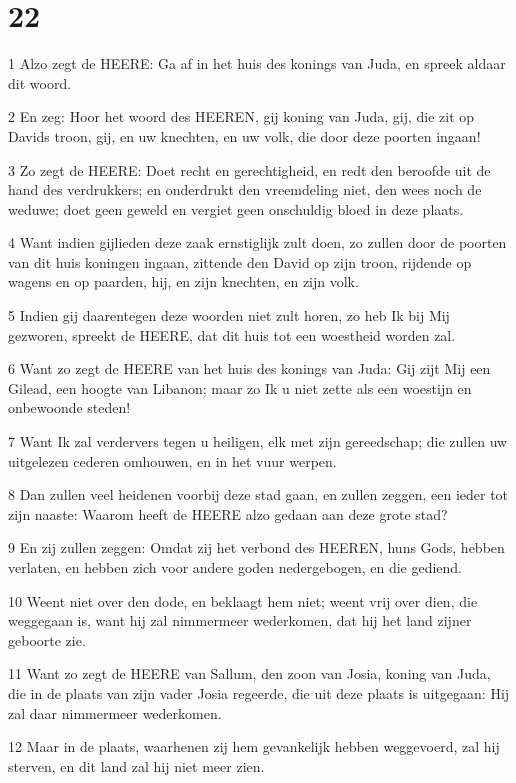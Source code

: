 \chapter{22}

\par 1 Alzo zegt de HEERE: Ga af in het huis des konings van Juda, en spreek aldaar dit woord.
\par 2 En zeg: Hoor het woord des HEEREN, gij koning van Juda, gij, die zit op Davids troon, gij, en uw knechten, en uw volk, die door deze poorten ingaan!
\par 3 Zo zegt de HEERE: Doet recht en gerechtigheid, en redt den beroofde uit de hand des verdrukkers; en onderdrukt den vreemdeling niet, den wees noch de weduwe; doet geen geweld en vergiet geen onschuldig bloed in deze plaats.
\par 4 Want indien gijlieden deze zaak ernstiglijk zult doen, zo zullen door de poorten van dit huis koningen ingaan, zittende den David op zijn troon, rijdende op wagens en op paarden, hij, en zijn knechten, en zijn volk.
\par 5 Indien gij daarentegen deze woorden niet zult horen, zo heb Ik bij Mij gezworen, spreekt de HEERE, dat dit huis tot een woestheid worden zal.
\par 6 Want zo zegt de HEERE van het huis des konings van Juda: Gij zijt Mij een Gilead, een hoogte van Libanon; maar zo Ik u niet zette als een woestijn en onbewoonde steden!
\par 7 Want Ik zal verdervers tegen u heiligen, elk met zijn gereedschap; die zullen uw uitgelezen cederen omhouwen, en in het vuur werpen.
\par 8 Dan zullen veel heidenen voorbij deze stad gaan, en zullen zeggen, een ieder tot zijn naaste: Waarom heeft de HEERE alzo gedaan aan deze grote stad?
\par 9 En zij zullen zeggen: Omdat zij het verbond des HEEREN, huns Gods, hebben verlaten, en hebben zich voor andere goden nedergebogen, en die gediend.
\par 10 Weent niet over den dode, en beklaagt hem niet; weent vrij over dien, die weggegaan is, want hij zal nimmermeer wederkomen, dat hij het land zijner geboorte zie.
\par 11 Want zo zegt de HEERE van Sallum, den zoon van Josia, koning van Juda, die in de plaats van zijn vader Josia regeerde, die uit deze plaats is uitgegaan: Hij zal daar nimmermeer wederkomen.
\par 12 Maar in de plaats, waarhenen zij hem gevankelijk hebben weggevoerd, zal hij sterven, en dit land zal hij niet meer zien.
